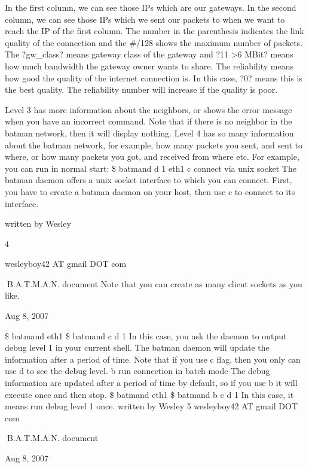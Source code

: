 \documentclass[
	12pt,
	a4paper,
	twoside,
	english,
	headsepline,
	footnosepline,
	automark,
	normalheadings,
	openany,
	cleardoubleplain,
	abstracton,
	idxtotoc,
	liststotoc,
	bibtotoc,
 	BCOR8mm,
]{scrartcl}
\begin{document}
In the first column, we can see those IPs  which are our gateways. In the second column, we can see those IPs which we sent our packets to when we  want to reach the IP of the first column. The number in the parenthesis indicates the  link quality of the connection and the \#/128 shows the maximum number of packets.  The ?gw\_class? means gateway class of the gateway and ?11  >6 MBit? means how  much bandwidth the gateway owner wants to share. The reliability means how good  the quality of the internet connection is. In this case, ?0? means this is the best  quality. The reliability number will increase if the quality is poor.

Level 3 has more information about the neighbors, or shows the error message when  you  have an incorrect command. Note that if there is no neighbor in the batman network, then it  will display nothing. Level 4 has so many information about the batman network, for example, how many packets  you sent, and sent to where, or how many packets you got, and received from where etc.  For example, you can run in normal start: \$ batmand  d 1 eth1  c connect via unix socket The batman daemon offers a unix socket interface to which you can connect. First, you have to create a batman daemon on your host, then use  c to connect to its  interface.

written by Wesley

4

wesleyboy42 AT gmail DOT com

B.A.T.M.A.N. document Note that you can create as many client sockets as you like.

Aug 8, 2007

\$ batmand eth1 \$ batmand   c  d 1  In this case, you ask the daemon to output debug level 1 in your current shell. The batman  daemon will update the information after a period of time. Note that if you use  c flag, then you only can use  d to see the debug level.  b run connection in batch mode The debug information are updated  after a  period of time by default, so if you use  b it will  execute once and then stop.  \$ batmand eth1 \$ batmand   b  c  d 1  In this case, it means run debug level 1 once. written by Wesley 5 wesleyboy42 AT gmail DOT com

B.A.T.M.A.N. document

Aug 8, 2007
\end{document}
